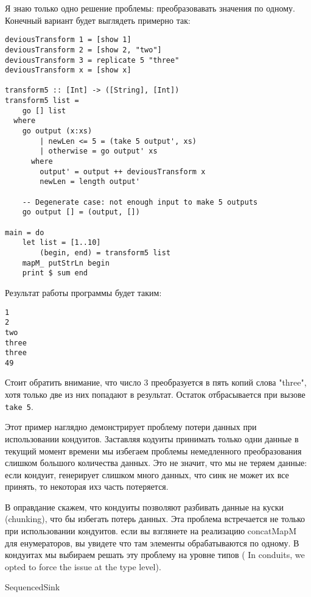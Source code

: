 Я знаю только одно решение проблемы: преобразовавать значения по одному. Конечный вариант будет выглядеть примерно так:
\begin{lstlisting}
deviousTransform 1 = [show 1]
deviousTransform 2 = [show 2, "two"]
deviousTransform 3 = replicate 5 "three"
deviousTransform x = [show x]

transform5 :: [Int] -> ([String], [Int])
transform5 list =
    go [] list
  where
    go output (x:xs)
        | newLen <= 5 = (take 5 output', xs)
        | otherwise = go output' xs
      where
        output' = output ++ deviousTransform x
        newLen = length output'

    -- Degenerate case: not enough input to make 5 outputs
    go output [] = (output, [])

main = do
    let list = [1..10]
        (begin, end) = transform5 list
    mapM_ putStrLn begin
    print $ sum end
\end{lstlisting}    
Результат работы программы будет таким:
\begin{verbatim}
1
2
two
three
three
49
\end{verbatim}
Стоит обратить внимание, что число 3 преобразуется в пять копий слова "three", хотя только две из них попадают в результат. Остаток отбрасывается при вызове \verb=take 5=.
 
Этот пример наглядно демонстрирует проблему потери данных при использовании кондуитов. Заставляя кодуиты принимать только одни данные в текущий момент времени мы избегаем проблемы немедленного преобразования слишком большого количества данных. Это не значит, что мы не теряем данные: если кондуит, генерирует слишком много данных, что синк не может их все принять, то некоторая ихз часть потеряется.
 
В оправдание скажем, что кондуиты позволяют разбивать данные на куски (chunking), что бы избегать потерь данных.
Эта проблема встречается не только при использовании кондуитов. если вы взглянете на реализацию concatMapM для енумераторов, вы увидете что там элементы обрабатываются по одному. В кондуитах мы выбираем решать эту проблему на уровне типов ( In conduits, we opted to force the issue at the type level).
 
 SequencedSink
 
